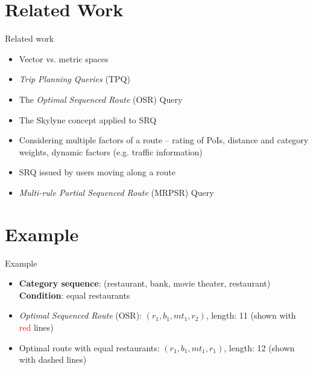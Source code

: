 \documentclass[18pt]{beamer}
\begin{document}
\section{Related Work}
	\begin{frame}{Related work}
	
		\begin{itemize}
			\item Vector vs. metric spaces
			\item \textit{Trip Planning Queries} (TPQ)
			\item The \textit{Optimal Sequenced Route} (OSR) Query
			\item The Skylyne concept applied to SRQ
			\item Considering multiple factors of a route – rating of PoIs, distance and category weights, dynamic factors (e.g. traffic information)
			\item SRQ issued by users moving along a route  
			\item \textit{Multi-rule Partial Sequenced Route} (MRPSR) Query
		\end{itemize}
	
	\end{frame}

\section{Example}
	\begin{frame}{Example}
	
		\begin{itemize}
			\item \textbf{Category sequence}: (restaurant, bank, movie theater, restaurant) 
			\textbf{Condition}: equal restaurants
			\pause
			\item \textit{Optimal Sequenced Route} (OSR): $(r_1, b_1, mt_1, r_2)$, length: 11 (shown with \textcolor{red}{red} lines)
			\item Optimal route with equal restaurants: $(r_1, b_1, mt_1, r_1)$, length: 12 (shown with dashed lines)
		\end{itemize}
	
	
	\end{frame}
\end{document}
